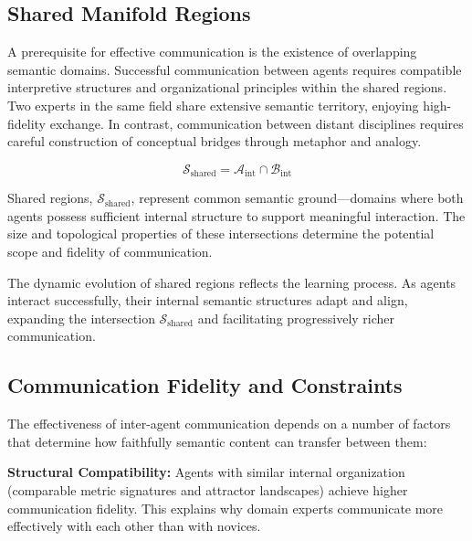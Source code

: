 
\subsection{Shared Manifold Regions}
\label{14.3.4:shared_manifold_regions}

A prerequisite for effective communication is the existence of overlapping semantic domains. Successful communication between agents requires compatible interpretive structures and organizational principles within the shared regions. Two experts in the same field share extensive semantic territory, enjoying high-fidelity exchange. In contrast, communication between distant disciplines requires careful construction of conceptual bridges through metaphor and analogy.

\begin{equation}
\mathcal{S}_{\mathrm{shared}} = \mathcal{A}_{\mathrm{int}} \cap \mathcal{B}_{\mathrm{int}}
\end{equation}

Shared regions, \(\mathcal{S}_{\mathrm{shared}}\), represent common semantic ground—domains where both agents possess sufficient internal structure to support meaningful interaction. The size and topological properties of these intersections determine the potential scope and fidelity of communication.

The dynamic evolution of shared regions reflects the learning process. As agents interact successfully, their internal semantic structures adapt and align, expanding the intersection \(\mathcal{S}_{\mathrm{shared}}\) and facilitating progressively richer communication.


\subsection{Communication Fidelity and Constraints}
\label{14.3.5:communication_fidelity_and_constraints}

The effectiveness of inter-agent communication depends on a number of factors that determine how faithfully semantic content can transfer between them:

\textbf{Structural Compatibility:} Agents with similar internal organization (comparable metric signatures and attractor landscapes) achieve higher communication fidelity. This explains why domain experts communicate more effectively with each other than with novices.

